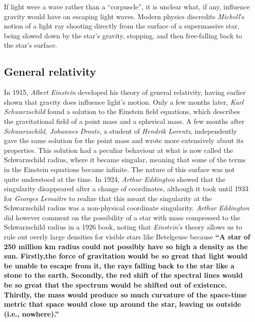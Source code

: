 \documentclass[twocolumn,12pt]{article}
\begin{document}
If light were a wave rather than a “corpuscle”, it is unclear what, if any, influence gravity would have on escaping light waves. Modern physics discredits\textit{ Michell}’s notion of a light ray shooting directly from the surface of a supermassive star, being slowed down by the star’s gravity, stopping, and then free-falling back to the star’s surface.

\subsection{\textbf{General relativity}}
In 1915, \textit{Albert Einstein} developed his theory of general relativity, having earlier shown that gravity does influence light’s motion. Only a few months later, \textit{Karl Schwarzschild} found a solution to the Einstein field equations, which describes the gravitational field of a point mass and a spherical mass. A few months after \textit{Schwarzschild, Johannes Droste}, a student of\textit{ Hendrik Lorentz}, independently gave the same solution for the point mass and wrote more extensively about its properties. This solution had a peculiar behaviour at what is now called the Schwarzschild radius, where it became singular, meaning that some of the terms in the Einstein equations became infinite. The nature of this surface was not quite understood at the time. In 1924, \textit{Arthur Eddington} showed that the singularity disappeared after a change of coordinates, although it took until 1933 for \textit{Georges  Lema\^{i}tre} to realize that this meant the singularity at the Schwarzschild radius was a non-physical coordinate singularity. \textit{Arthur Eddington} did however comment on the possibility of a star with mass compressed to the Schwarzschild radius in a 1926 book, noting that \textit{ Einstein}’s theory allows us to rule out overly large densities for visible stars like Betelgeuse because \textbf{“A star of 250 million km radius could not possibly have so high a density as the sun. Firstly,the force of gravitation would be so great that light would be unable to escape from it, the rays falling back to the star like a stone to the earth. Secondly, the red shift of the spectral lines would be so great that the spectrum would be shifted out of existence. Thirdly, the mass would produce so much curvature of the space-time metric that space would close up around the star, leaving us outside (i.e., nowhere).”}\\ 
\end{document}
